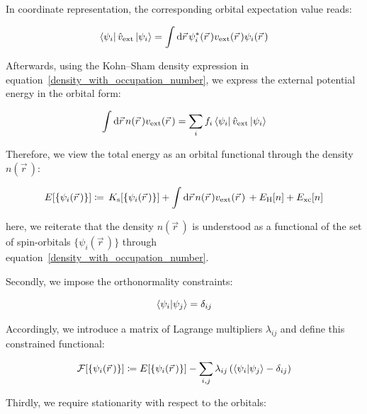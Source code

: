 In coordinate representation, the corresponding orbital expectation value reads:

\begin{equation}
    \bra{\psi_i}\hat{v}_\mathrm{ext}\ket{\psi_i}=
    \int\mathrm{d}{\vec{r}}\,
    \psi_i^\ast(\vec{r}\,)v_\mathrm{ext}(\vec{r}\,)\psi_i(\vec{r}\,)
\label{KS_external_operator_expectation_coordinate}
\end{equation}

Afterwards, using the Kohn--Sham density expression in equation~\eqref{density_with_occupation_number},
we express the external potential energy in the orbital form:

\begin{equation}
    \int\mathrm{d}{\vec{r}}\,n(\vec{r}\,)v_\mathrm{ext}(\vec{r}\,)
    = \sum_{i}f_{i}\bra{\psi_i}\hat{v}_\mathrm{ext}\ket{\psi_i}
\label{KS_external_energy_orbital_form}
\end{equation}

Therefore, we view the total energy as an orbital functional through the density $n(\vec{r}\,)$:

\begin{equation}
    E[\{\psi_i(\vec{r}\,)\}]\coloneqq
    \,K_\mathrm{s}[\{\psi_i(\vec{r}\,)\}]
    + \int \mathrm{d}{\vec{r}}\,
    n(\vec{r}\,)v_\mathrm{ext}(\vec{r}\,) 
    \,+ E_\mathrm{H}[n]
    + E_\mathrm{xc}[n]
\label{KS_total_energy_orbital_functional}
\end{equation}

here, we reiterate that the density $n(\vec{r}\,)$ is understood as a functional of the set of spin-orbitals $\{\psi_i(\vec{r}\,)\}$ through equation~\eqref{density_with_occupation_number}.

Secondly, we impose the orthonormality constraints:

\begin{equation}
    \braket{\psi_i|\psi_j}=\delta_{ij}
\label{KS_orbital_orthonormality}
\end{equation}

Accordingly, we introduce a matrix of Lagrange multipliers $\lambda_{ij}$ and define this constrained functional:

\begin{equation}
    \mathcal{F}[\{\psi_i(\vec{r}\,)\}]\coloneqq
    E[\{\psi_i(\vec{r}\,)\}]
    -\sum_{i,j}\lambda_{ij}\left(\braket{\psi_i|\psi_j}-\delta_{ij}\right)
\label{KS_constrained_functional_orbitals}
\end{equation}

Thirdly, we require stationarity with respect to the orbitals:

